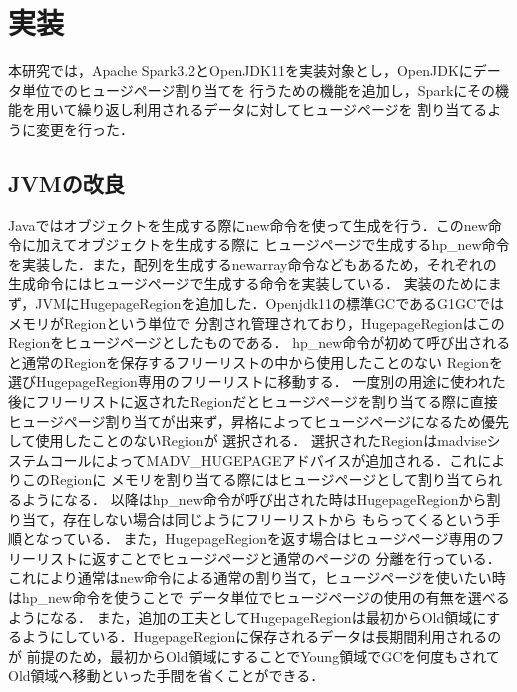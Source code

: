 \section{実装} \label{section:implementation}
本研究では，Apache Spark3.2とOpenJDK11\cite{open-jdk}を実装対象とし，OpenJDKにデータ単位でのヒュージページ割り当てを
行うための機能を追加し，Sparkにその機能を用いて繰り返し利用されるデータに対してヒュージページを
割り当てるように変更を行った．

\subsection{JVMの改良}
Javaではオブジェクトを生成する際にnew命令を使って生成を行う．このnew命令に加えてオブジェクトを生成する際に
ヒュージページで生成するhp\_new命令を実装した．また，配列を生成するnewarray命令などもあるため，それぞれの
生成命令にはヒュージページで生成する命令を実装している．
実装のためにまず，JVMにHugepageRegionを追加した．Openjdk11の標準GCであるG1GC\cite{detlefs2004garbage}ではメモリがRegionという単位で
分割され管理されており，HugepageRegionはこのRegionをヒュージページとしたものである．
hp\_new命令が初めて呼び出されると通常のRegionを保存するフリーリストの中から使用したことのない
Regionを選びHugepageRegion専用のフリーリストに移動する．
一度別の用途に使われた後にフリーリストに返されたRegionだとヒュージページを割り当てる際に直接
ヒュージページ割り当てが出来ず，昇格によってヒュージページになるため優先して使用したことのないRegionが
選択される．
選択されたRegionはmadviseシステムコールによってMADV\_HUGEPAGEアドバイスが追加される．これによりこのRegionに
メモリを割り当てる際にはヒュージページとして割り当てられるようになる．
以降はhp\_new命令が呼び出された時はHugepageRegionから割り当て，存在しない場合は同じようにフリーリストから
もらってくるという手順となっている．
また，HugepageRegionを返す場合はヒュージページ専用のフリーリストに返すことでヒュージページと通常のページの
分離を行っている．
これにより通常はnew命令による通常の割り当て，ヒュージページを使いたい時はhp\_new命令を使うことで
データ単位でヒュージページの使用の有無を選べるようになる．
また，追加の工夫としてHugepageRegionは最初からOld領域にするようにしている．HugepageRegionに保存されるデータは長期間利用されるのが
前提のため，最初からOld領域にすることでYoung領域でGCを何度もされてOld領域へ移動といった手間を省くことができる．

